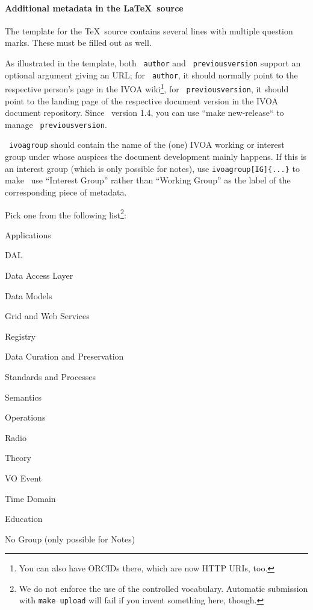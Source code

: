 \documentclass[11pt,a4paper]{ivoa}
\newcommand{\texword}[1]{\texttt{\color{texcolor} #1}}
\begin{document}
\paragraph{Additional metadata in the \LaTeX~source}

The template for the \TeX\ source contains several lines with
multiple question marks.  These must be filled out as well.

As illustrated in the template, both \texword{author} and
\texword{previousversion} support an optional argument giving an URL; for
\texword{author}, it should normally point to the respective person's
page in the IVOA wiki\footnote{You can also have ORCIDs there, which are
now HTTP URIs, too.}, for \texword{previousversion}, it should point to
the landing page of the respective document version in the IVOA document
repository.  Since \ivoatex~version 1.4, you can use ``make
new-release`` to manage \texword{previousversion}.

\texword{ivoagroup} should contain the name of the (one) IVOA working or
interest group under whose auspices the document development mainly
happens.  If this is an interest group (which is only possible for
notes), use \verb|ivoagroup[IG]{...}| to make \ivoatex~use ``Interest
Group'' rather than ``Working Group'' as the label of the corresponding
piece of metadata.

Pick one from the following list\footnote{We do not
enforce the use of the controlled vocabulary.  Automatic submission
with \texttt{make upload} will fail if you invent something here,
though.}:

\begin{compactitem}
\item Applications
\item DAL
\item Data Access Layer
\item Data Models
\item Grid and Web Services
\item Registry
\item Data Curation and Preservation
\item Standards and Processes
\item Semantics
\item Operations
\item Radio
\item Theory
\item VO Event
\item Time Domain
\item Education
\item No Group (only possible for Notes)
\end{compactitem}
\end{document}

